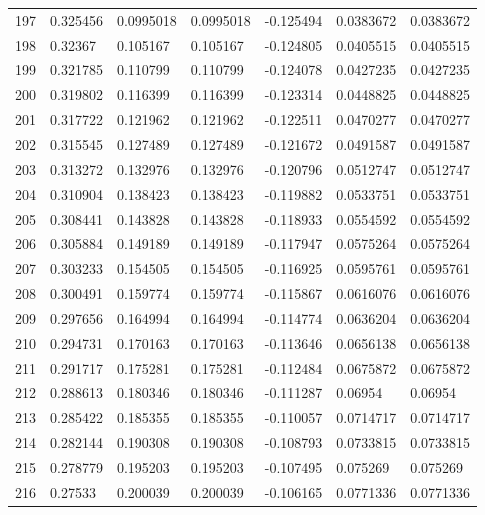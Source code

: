 \begin{longtable}{l|lll|lll}
 197 &  0.325456    & 0.0995018   & 0.0995018   & -0.125494    & 0.0383672   & 0.0383672   \\
 198 &  0.32367     & 0.105167    & 0.105167    & -0.124805    & 0.0405515   & 0.0405515   \\
 199 &  0.321785    & 0.110799    & 0.110799    & -0.124078    & 0.0427235   & 0.0427235   \\
 200 &  0.319802    & 0.116399    & 0.116399    & -0.123314    & 0.0448825   & 0.0448825   \\
 201 &  0.317722    & 0.121962    & 0.121962    & -0.122511    & 0.0470277   & 0.0470277   \\
 202 &  0.315545    & 0.127489    & 0.127489    & -0.121672    & 0.0491587   & 0.0491587   \\
 203 &  0.313272    & 0.132976    & 0.132976    & -0.120796    & 0.0512747   & 0.0512747   \\
 204 &  0.310904    & 0.138423    & 0.138423    & -0.119882    & 0.0533751   & 0.0533751   \\
 205 &  0.308441    & 0.143828    & 0.143828    & -0.118933    & 0.0554592   & 0.0554592   \\
 206 &  0.305884    & 0.149189    & 0.149189    & -0.117947    & 0.0575264   & 0.0575264   \\
 207 &  0.303233    & 0.154505    & 0.154505    & -0.116925    & 0.0595761   & 0.0595761   \\
 208 &  0.300491    & 0.159774    & 0.159774    & -0.115867    & 0.0616076   & 0.0616076   \\
 209 &  0.297656    & 0.164994    & 0.164994    & -0.114774    & 0.0636204   & 0.0636204   \\
 210 &  0.294731    & 0.170163    & 0.170163    & -0.113646    & 0.0656138   & 0.0656138   \\
 211 &  0.291717    & 0.175281    & 0.175281    & -0.112484    & 0.0675872   & 0.0675872   \\
 212 &  0.288613    & 0.180346    & 0.180346    & -0.111287    & 0.06954     & 0.06954     \\
 213 &  0.285422    & 0.185355    & 0.185355    & -0.110057    & 0.0714717   & 0.0714717   \\
 214 &  0.282144    & 0.190308    & 0.190308    & -0.108793    & 0.0733815   & 0.0733815   \\
 215 &  0.278779    & 0.195203    & 0.195203    & -0.107495    & 0.075269    & 0.075269    \\
 216 &  0.27533     & 0.200039    & 0.200039    & -0.106165    & 0.0771336   & 0.0771336   \\

\end{longtable}
